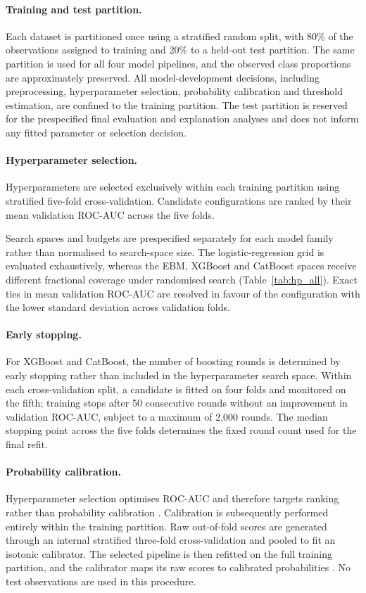 \paragraph{Training and test partition.}
Each dataset is partitioned once using a stratified random split, with 80\% of
the observations assigned to training and 20\% to a held-out test partition.
The same partition is used for all four model pipelines, and the observed class
proportions are approximately preserved. All model-development decisions,
including preprocessing, hyperparameter selection, probability calibration and
threshold estimation, are confined to the training partition. The test partition
is reserved for the prespecified final evaluation and explanation analyses and
does not inform any fitted parameter or selection decision.

\paragraph{Hyperparameter selection.}
Hyperparameters are selected exclusively within each training partition using
stratified five-fold cross-validation. Candidate configurations are ranked by
their mean validation ROC-AUC across the five folds.

Search spaces and budgets are prespecified separately for each model family
rather than normalised to search-space size. The logistic-regression grid is
evaluated exhaustively, whereas the EBM, XGBoost and CatBoost spaces receive
different fractional coverage under randomised search
(Table~\ref{tab:hp_all}). Exact ties in mean validation ROC-AUC are resolved in
favour of the configuration with the lower standard deviation across validation
folds.

\paragraph{Early stopping.}
For XGBoost and CatBoost, the number of boosting rounds is determined by early
stopping rather than included in the hyperparameter search space. Within each
cross-validation split, a candidate is fitted on four folds and monitored on the
fifth; training stops after 50 consecutive rounds without an improvement in
validation ROC-AUC, subject to a maximum of 2{,}000 rounds. The
median stopping point across the five folds determines the fixed round count used
for the final refit.

\paragraph{Probability calibration.}
Hyperparameter selection optimises ROC-AUC and therefore targets ranking rather
than probability calibration \citep{bequeApproachesCreditScorecard2017}. Calibration is subsequently performed entirely
within the training partition. Raw out-of-fold scores are generated through an
internal stratified three-fold cross-validation and pooled to fit an isotonic
calibrator. The selected pipeline is then refitted on the full training partition,
and the calibrator maps its raw scores to calibrated probabilities \citep{bequeApproachesCreditScorecard2017}. No test
observations are used in this procedure.

